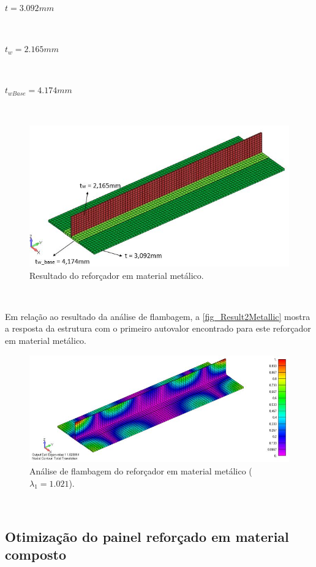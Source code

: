 \centerline{$t = 3.092 mm$}\

\centerline{$t_w = 2.165 mm$}\

\centerline{$t_{wBase} = 4.174 mm$}\

\begin{figure}[ht]
 \caption{\label{fig_Result1Metallic}Resultado do reforçador em material metálico.}
 \centering
 \includegraphics[scale=0.7]{figura/Results_Metallic}
\end{figure}
\

Em relação ao resultado da análise de flambagem, a \autoref{fig_Result2Metallic} mostra a resposta da estrutura com o primeiro autovalor encontrado para este reforçador em material metálico.

\begin{figure}[ht]
 \caption{\label{fig_Result2Metallic}Análise de flambagem do reforçador em material metálico ($\lambda_1 = 1.021$).}
 \centering
 \includegraphics[scale=0.7]{figura/Results2_Metallic}
\end{figure}
\

\subsection{Otimização do painel reforçado em material composto}

